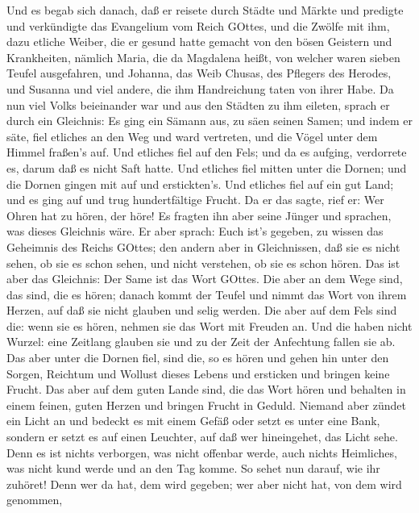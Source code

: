  Und es begab sich danach, daß er reisete durch Städte und
Märkte und predigte und verkündigte das Evangelium vom Reich GOttes, und
die Zwölfe mit ihm,  dazu etliche Weiber, die er gesund
hatte gemacht von den bösen Geistern und Krankheiten, nämlich Maria, die
da Magdalena heißt, von welcher waren sieben Teufel ausgefahren,
 und Johanna, das Weib Chusas, des Pflegers des Herodes, und
Susanna und viel andere, die ihm Handreichung taten von ihrer Habe.
 Da nun viel Volks beieinander war und aus den Städten zu
ihm eileten, sprach er durch ein Gleichnis:  Es ging ein
Sämann aus, zu säen seinen Samen; und indem er säte, fiel etliches an
den Weg und ward vertreten, und die Vögel unter dem Himmel fraßen's auf.
 Und etliches fiel auf den Fels; und da es aufging,
verdorrete es, darum daß es nicht Saft hatte.  Und etliches
fiel mitten unter die Dornen; und die Dornen gingen mit auf und
erstickten's.  Und etliches fiel auf ein gut Land; und es
ging auf und trug hundertfältige Frucht. Da er das sagte, rief er: Wer
Ohren hat zu hören, der höre!  Es fragten ihn aber seine
Jünger und sprachen, was dieses Gleichnis wäre.  Er aber
sprach: Euch ist's gegeben, zu wissen das Geheimnis des Reichs GOttes;
den andern aber in Gleichnissen, daß sie es nicht sehen, ob sie es schon
sehen, und nicht verstehen, ob sie es schon hören.  Das ist
aber das Gleichnis: Der Same ist das Wort GOttes.  Die aber
an dem Wege sind, das sind, die es hören; danach kommt der Teufel und
nimmt das Wort von ihrem Herzen, auf daß sie nicht glauben und selig
werden.  Die aber auf dem Fels sind die: wenn sie es hören,
nehmen sie das Wort mit Freuden an. Und die haben nicht Wurzel: eine
Zeitlang glauben sie und zu der Zeit der Anfechtung fallen sie ab.
 Das aber unter die Dornen fiel, sind die, so es hören und
gehen hin unter den Sorgen, Reichtum und Wollust dieses Lebens und
ersticken und bringen keine Frucht.  Das aber auf dem guten
Lande sind, die das Wort hören und behalten in einem feinen, guten
Herzen und bringen Frucht in Geduld.  Niemand aber zündet
ein Licht an und bedeckt es mit einem Gefäß oder setzt es unter eine
Bank, sondern er setzt es auf einen Leuchter, auf daß wer hineingehet,
das Licht sehe.  Denn es ist nichts verborgen, was nicht
offenbar werde, auch nichts Heimliches, was nicht kund werde und an den
Tag komme.  So sehet nun darauf, wie ihr zuhöret! Denn wer
da hat, dem wird gegeben; wer aber nicht hat, von dem wird genommen,
